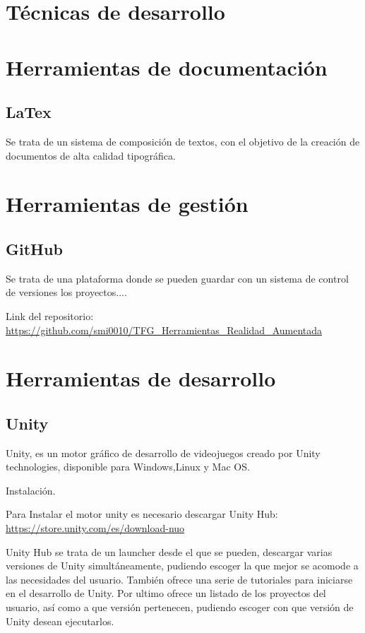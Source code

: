 

\section{Técnicas de desarrollo}

\section{Herramientas de documentación}
\subsection{LaTex}
Se trata de un sistema de composición de textos, con el objetivo de la creación de documentos de alta calidad tipográfica.
\section{Herramientas de gestión}
\subsection{GitHub}
Se trata de una plataforma donde se pueden guardar con un sistema de control de versiones los proyectos....

 Link del repositorio: \url{https://github.com/smi0010/TFG_Herramientas_Realidad_Aumentada}

\section{Herramientas de desarrollo}
\subsection{Unity}
Unity, es un motor gráfico de desarrollo de videojuegos creado por Unity technologies, disponible para Windows,Linux y Mac OS.

Instalación.

Para Instalar el motor unity es necesario descargar Unity Hub: \url{https://store.unity.com/es/download-nuo}

Unity Hub se trata de un launcher desde el que se pueden, descargar varias versiones de Unity simultáneamente, pudiendo escoger la que mejor se acomode a las necesidades del usuario. También ofrece una serie de tutoriales para iniciarse en el desarrollo de Unity. Por ultimo ofrece un listado de los proyectos del usuario, así como a que versión pertenecen, pudiendo escoger con que versión de Unity desean ejecutarlos.

